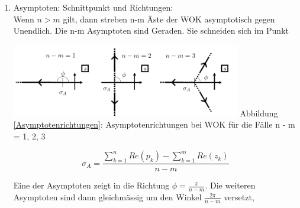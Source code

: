 \begin{enumerate}
\item Asymptoten: Schnittpunkt und Richtungen:\\
Wenn $n > m$ gilt, dann streben n-m Äste der WOK asymptotisch gegen
Unendlich. Die n-m Asymptoten sind Geraden. Sie schneiden sich im Punkt
\begin{multicols}{2}
		\includegraphics[width=10cm]{./images/asymptotenrichtunge.png}
Abbildung \ref{Asymptotenrichtungen}: Asymptotenrichtungen bei WOK für die Fälle n - m = 1, 2, 3
		\label{Asymptotenrichtungen}
\columnbreak
	\begin{flushright}
		\[\boxed{\sigma_A=\frac{\sum\limits_{k=1}^{n} Re(p_k)-\sum\limits_{k=1}^{m} Re(z_k)}{n-m}}\]
	\end{flushright}
\end{multicols}
Eine der Asymptoten zeigt in die Richtung $\phi = \frac{\pi}{n-m}$. Die weiteren Asymptoten
sind dann gleichmässig um den Winkel $\frac{2\pi}{n-m}$ versetzt,



\end{enumerate}

